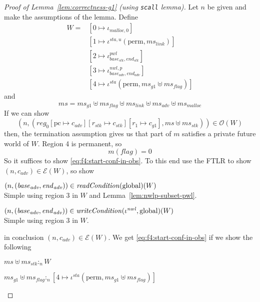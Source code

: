\documentclass[a4paper]{article}
\newcommand{\update}[2]{[#1 \mapsto #2]}
\newcommand{\var}[1]{\mathit{#1}}
\newcommand{\hs}{\var{ms}}
\newcommand{\ms}{\hs}
\newcommand{\pcreg}{\mathrm{pc}}
\newcommand{\start}{\var{base}}
\newcommand{\addrend}{\var{end}}
\newcommand{\reg}{\var{reg}}
\newcommand{\heap}{\var{mem}}
\newcommand{\adv}{\var{adv}}
\newcommand{\link}{\var{link}}
\newcommand{\stk}{\var{stk}}
\newcommand{\flag}{\var{flag}}
\newcommand{\nwl}{\var{nwl}}
\newcommand{\pwl}{\var{pwl}}
\newcommand{\sta}{\var{sta}}
\newcommand{\plainfun}[2]{
  \ifthenelse{\equal{#2}{}}
  {\mathit{#1}}
  {\mathit{#1}(#2)}
}
\newcommand{\readCond}[1]{\plainfun{readCondition}{#1}}
\newcommand{\writeCond}[1]{\plainfun{writeCondition}{#1}}
\newcommand{\heapSat}[3][\heap]{#1 :_{#2} #3}
\newcommand{\memSat}[3][n]{\heapSat[#2]{#1}{#3}}
\newcommand{\codelabel}[1]{\mathit{#1}}
\newcommand{\malloc}{\codelabel{malloc}}
\newcommand{\asmType}{\plaindom{AsmType}}
\newcommand{\plaindom}[1]{\mathrm{#1}}
\newcommand{\intr}[2]{\mathcal{#1}}
\newcommand{\exprintr}[1]{\intr{E}{#1}}
\newcommand{\stder}{\exprintr{\asmType}}
\newcommand{\observations}{\mathcal{O}}
\newcommand{\npair}[2][n]{\left(#1,#2 \right)}
\newcommand{\plainperm}[1]{\mathrm{#1}}
\newcommand{\glob}{\plainperm{global}}
\newcommand{\plainview}[1]{\mathrm{#1}}
\newcommand{\perma}{\plainview{perm}}
\begin{document}
\begin{proof}[Proof of Lemma~\ref{lem:correctness-g1} (using \texttt{scall} lemma)]
  Let $n$ be given and make the assumptions of the lemma. Define
  \begin{align*}
    W = & [0 \mapsto \iota_{\malloc,0}]\\
        & [1 \mapsto \iota^{\sta,u} (\perma,\ms_\link)]\\
        & [2 \mapsto \iota^\pwl_{\start_\stk, \addrend_\stk}]\\
        & [3 \mapsto \iota^{\nwl,p}_{\start_\adv,\addrend_\adv}]\\
        & [4 \mapsto \iota^\sta (\perma,\ms_{g1} \uplus \ms_\flag)]
  \end{align*}
  and
  \[
    \ms = \ms_{g1} \uplus 
          \ms_\flag \uplus                
          \ms_\link \uplus 
          \ms_\adv \uplus 
          \ms_\malloc 
  \]
  If we can show
  \begin{equation}
    \label{eq:f4:start-conf-in-obs}
        \npair{(\reg_0\update{\pcreg}{c_\adv}\update{r_\stk}{c_\stk}\update{r_1}{c_{g1}},\ms \uplus \ms_\stk)} \in \observations(W)
  \end{equation}
  then, the termination assumption gives us that part of $m$ satisfies a private future world of $W$. Region 4 is permanent, so
  \[
    m(\flag) = 0
  \]
  So it suffices to show \ref{eq:f4:start-conf-in-obs}. 
  To this end use the FTLR to show $\npair{c_\adv} \in \stder(W)$, so show
  \begin{enumproof}
    \item $\npair{(\start_\adv,\addrend_\adv)} \in \readCond{}(\glob)(W)$\\
      Simple using region $3$ in $W$ and Lemma~\ref{lem:nwlp-subset-pwl}.
    \item $\npair{(\start_\adv,\addrend_\adv)} \in \writeCond{}(\iota^\nwl,\glob)(W)$\\
      Simple using region $3$ in $W$.
  \end{enumproof}
  in conclusion $\npair{c_\adv} \in \stder(W)$. We get \ref{eq:f4:start-conf-in-obs} if we show the following
  \begin{enumproof}[resume]
    \item $\memSat{\ms \uplus \ms_\stk}{W}$\\
      \begin{enumproof}
        \item $\memSat{\ms_{g1} \uplus \ms_\flag}{[4 \mapsto \iota^\sta (\perma,\ms_{g1} \uplus \ms_\flag)]}$ \\

\end{enumproof}
\end{enumproof}
\end{proof}
\end{document}
